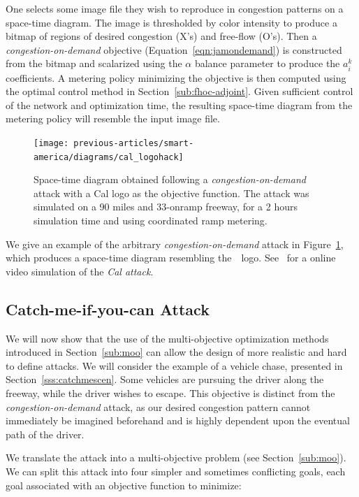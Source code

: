 One selects some image file they wish to reproduce in congestion patterns on a space-time diagram. The image is thresholded by color intensity to produce a bitmap of regions of desired congestion (X's) and free-flow (O's). Then a \emph{congestion-on-demand} objective (Equation~\eqref{eqn:jamondemand}) is constructed from the bitmap and scalarized using the $\alpha$ balance parameter to produce the $a_i^k$ coefficients. A metering policy minimizing the objective is then computed using the optimal control method in Section~\ref{sub:fhoc-adjoint}. Given sufficient control of the network and optimization time, the resulting space-time diagram from the metering policy will resemble the input image file.

\begin{figure}[ht]
\centering
  \texttt{[image: previous-articles/smart-america/diagrams/cal\_logohack]}
\caption{Space-time diagram obtained following a \emph{congestion-on-demand} attack with a Cal logo as the objective function. The attack was simulated on a 90 miles and 33-onramp freeway, for a 2 hours simulation time and using coordinated ramp metering.}
\label{fig:cal_logo}
\end{figure}

We give an example of the arbitrary \emph{congestion-on-demand} attack in Figure~\ref{fig:cal_logo}, which produces a space-time diagram resembling the~~logo. See~\cite{smartroadswebsite} for a online video simulation of the \emph{Cal attack}.

\subsection{Catch-me-if-you-can Attack}
\label{sub:catchme}
We will now show that the use of the multi-objective optimization methods introduced in Section~\ref{sub:moo} can allow the design of more realistic and hard to define attacks. We will consider the example of a vehicle chase, presented in Section~\ref{sss:catchmescen}. Some vehicles are pursuing the driver along the freeway, while the driver wishes to escape. This objective is distinct from the \emph{congestion-on-demand} attack, as our desired congestion pattern cannot immediately be imagined beforehand and is highly dependent upon the eventual path of the driver.

We translate the attack into a multi-objective problem (see Section~\ref{sub:moo}). We can split this attack into four simpler and sometimes conflicting goals, each goal associated with an objective function to minimize:

